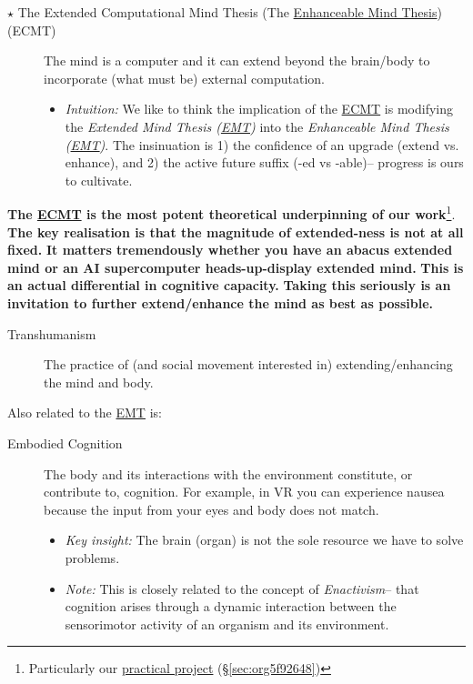 \documentclass[logo,bsc,singlespacing,parskip]{infthesis}
\begin{document}
{\begin{mdframed}
\begin{description}
\item[{\(\star\) The Extended Computational Mind Thesis (The \hyperref[org33f9226]{Enhanceable Mind Thesis}) (\label{org760d146}ECMT)}] The mind is a computer and it can extend beyond the brain/body to incorporate (what must be) external computation.
\begin{itemize}
\item \emph{Intuition:} We like to think the implication of the \hyperref[org760d146]{ECMT} is modifying the \emph{Extended Mind Thesis (\hyperref[org3b15c2d]{EMT})} into the \emph{\label{org33f9226}Enhanceable Mind Thesis (\hyperref[org3b15c2d]{EMT})}.
The insinuation is 1) the confidence of an upgrade (extend vs. enhance), and 2) the active future suffix (-ed vs -able)-- progress is ours to cultivate.
\end{itemize}
\end{description}
\end{mdframed}

\textbf{The \hyperref[org760d146]{ECMT} is the most potent theoretical underpinning of our work}\footnote{Particularly our \hyperref[sec:org5f92648]{practical project} (\S \ref{sec:org5f92648})}.
\textbf{The key realisation is that the magnitude of extended-ness is not at all fixed.}
\textbf{It matters tremendously whether you have an abacus extended mind or an AI supercomputer heads-up-display extended mind.}
\textbf{This is an actual differential in cognitive capacity.}
\textbf{Taking this seriously is an invitation to further extend/enhance the mind as best as possible.}

\begin{mdframed}
\begin{description}
\item[{\label{orgdc9cd5b}Transhumanism}] The practice of (and social movement interested in) extending/enhancing the mind and body.
\end{description}
\end{mdframed}

Also related to the \hyperref[org3b15c2d]{EMT} is:

\begin{mdframed}
\begin{description}
\item[{\label{orgef09c3f}Embodied Cognition}] The body and its interactions with the environment constitute, or contribute to, cognition.
For example, in VR you can experience nausea because the input from your eyes and body does not match.
\begin{itemize}
\item \emph{Key insight:} The brain (organ) is not the sole resource we have to solve problems.
\item \emph{Note:} This is closely related to the concept of \emph{Enactivism}-- that cognition arises through a dynamic interaction between the sensorimotor activity of an organism and its environment.
\end{itemize}
\end{description}
\end{mdframed}

}
\end{document}
